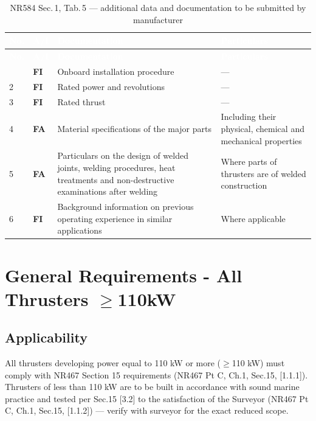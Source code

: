 \documentclass[11pt,a4paper]{report}
\newcommand{\fa}{\textbf{\textcolor{warningred}{FA}}}
\newcommand{\fic}{\textbf{\textcolor{bvgray}{FI}}}
\begin{document}
\begin{longtable}{|p{0.7cm}|p{1.1cm}|p{5.8cm}|p{6.4cm}|}
\caption{NR584 Sec.\,1, Tab.\,5 --- additional data and documentation to be submitted by manufacturer} \label{tab:nr584t5} \\
\hline
\rowcolor{bvblue}
\textcolor{white}{\textbf{No.}} & \textcolor{white}{\textbf{A/I}} & \textcolor{white}{\textbf{Documentation}} & \textcolor{white}{\textbf{Particulars}} \\
\hline
\endfirsthead
\hline
\rowcolor{bvblue}
\textcolor{white}{\textbf{No.}} & \textcolor{white}{\textbf{A/I}} & \textcolor{white}{\textbf{Documentation}} & \textcolor{white}{\textbf{Particulars}} \\
\hline
\endhead
\hline
\endlastfoot
1 & \fic{} & Onboard installation procedure & --- \\
\hline
2 & \fic{} & Rated power and revolutions & --- \\
\hline
3 & \fic{} & Rated thrust & --- \\
\hline
4 & \fa{} & Material specifications of the major parts & Including their physical, chemical and mechanical properties \\
\hline
5 & \fa{} & Particulars on the design of welded joints, welding procedures, heat treatments and non-destructive examinations after welding & Where parts of thrusters are of welded construction \\
\hline
6 & \fic{} & Background information on previous operating experience in similar applications & Where applicable \\
\hline
\end{longtable}

\newpage

\chapter{General Requirements - All Thrusters $\geq$110kW}
\label{ch:general}

\section{Applicability}
All thrusters developing power equal to 110 kW or more ($\geq$110 kW) must comply with NR467 Section 15 requirements (NR467 Pt C, Ch.1, Sec.15, [1.1.1]). Thrusters of less than 110 kW are to be built in accordance with sound marine practice and tested per Sec.15 [3.2] to the satisfaction of the Surveyor (NR467 Pt C, Ch.1, Sec.15, [1.1.2]) --- verify with surveyor for the exact reduced scope.
\end{document}
